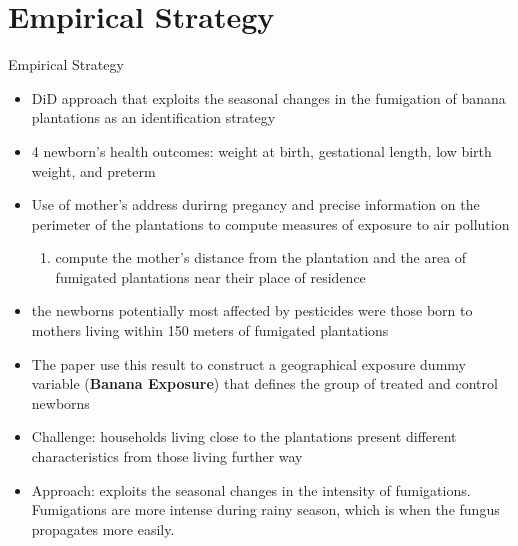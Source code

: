 \documentclass[hyperref={pdfpagelabels=false}]{beamer}
\begin{document}
	\section{Empirical Strategy}
	\begin{frame}{Empirical Strategy}
		
		\begin{itemize}
			\justifying
			\item DiD approach that exploits the seasonal changes in the fumigation of banana plantations as an identification strategy
			\vspace{2mm}
			\item 4 newborn's health outcomes: weight at birth, gestational length, low birth weight, and preterm
			\vspace{2mm}
			\item Use of mother's address durirng pregancy and precise information on the perimeter of the plantations to compute measures of exposure to air pollution
			\begin{enumerate}
				\vspace{2mm}
				\item compute the mother's distance from the plantation and the area of fumigated plantations near their place of residence
			\end{enumerate}
		\end{itemize}
		
	\end{frame}
	
	\begin{frame}{}
		
		\begin{itemize}
			\justifying
			\item the newborns potentially most affected by pesticides were those born to mothers living within 150 meters of fumigated plantations
			\vspace{2mm}
			\item The paper use this result to construct a geographical exposure dummy variable (\textcolor{myblue}{\textbf{Banana Exposure}}) that defines the group of treated and control newborns
			\vspace{2mm}
			\item \textcolor{bondiblue}{Challenge}: households living close to the plantations present different characteristics from those living further way 
			\vspace{2mm}
			\item \textcolor{bondiblue}{Approach}: exploits the seasonal changes in the intensity of fumigations. Fumigations are more intense during rainy season, which is when the fungus propagates more easily.
			
		\end{itemize}
		
	\end{frame}
	
\end{document}
